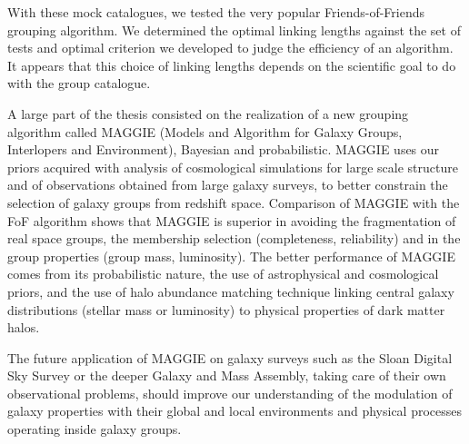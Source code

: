 \begin{bartabstract}
    With these mock catalogues, we tested the very popular Friends-of-Friends
    grouping algorithm. We determined the optimal linking lengths against the
    set of tests and optimal criterion we developed to judge the efficiency of
    an algorithm. It appears that this choice of linking lengths depends on the
    scientific goal to do with the group catalogue.

    A large part of the thesis consisted on the realization of a new grouping
    algorithm called MAGGIE (Models and Algorithm for Galaxy Groups,
    Interlopers and Environment), Bayesian and probabilistic. MAGGIE uses our
    priors acquired with analysis of cosmological simulations for large scale
    structure and of observations obtained from large galaxy surveys, to better
    constrain the selection of galaxy groups from redshift space. Comparison of
    MAGGIE with the FoF algorithm shows that MAGGIE is superior in avoiding the
    fragmentation of real space groups, the membership selection (completeness,
    reliability) and in the group properties (group mass, luminosity). The
    better performance of MAGGIE comes from its probabilistic nature, the use
    of astrophysical and cosmological priors, and the use of halo abundance
    matching technique linking central galaxy distributions (stellar mass or
    luminosity) to physical properties of dark matter halos.

    The future application of MAGGIE on galaxy surveys such as the Sloan
    Digital Sky Survey or the deeper Galaxy and Mass Assembly, taking care of
    their own observational problems, should improve our understanding of the
    modulation of galaxy properties with their global and local environments
    and physical processes operating inside galaxy groups.

\end{bartabstract}

